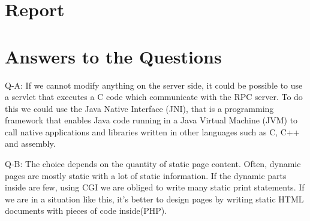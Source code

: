 





\maketitle

%
%
%
%
%


\section{Report}
\section{Answers to the Questions}
Q-A: If we cannot modify anything on the server side, it could be possible to use a servlet that executes a C code which communicate with the RPC server. To do this we could use the Java Native Interface (JNI), that is a programming framework that enables Java code running in a Java Virtual Machine (JVM) to call native applications and libraries written in other languages such as C, C++ and assembly.

Q-B: The choice depends on the quantity of static page content. Often, dynamic pages are mostly static with a lot of static information. If the dynamic parts inside are few, using CGI we are obliged to write many static print statements. If we are in a situation like this, it's better to design pages by writing static HTML documents with pieces of code inside(PHP).

